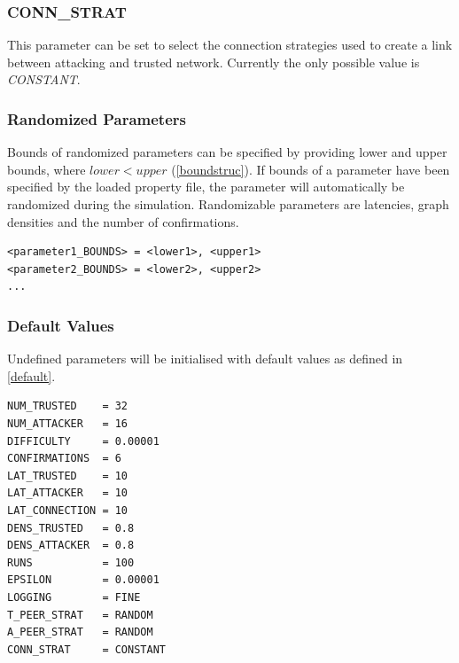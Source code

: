 \documentclass[a4paper,12pt,twoside]{report}
\begin{document}
\subsubsection{CONN\_STRAT}
This parameter can be set to select the connection strategies used to create a link between attacking and trusted network. Currently the only possible value is \textit{CONSTANT}.
\subsubsection{Randomized Parameters}
Bounds of randomized parameters can be specified by providing lower and upper bounds, where $lower < upper$ (\autoref{boundstruc}). If bounds of a parameter have been specified by the loaded property file, the parameter will automatically be randomized during the simulation. Randomizable parameters are latencies, graph densities and the number of confirmations.
\begin{lstlisting}[caption=Defining bounds of randomized parameters,label=boundstruc]
<parameter1_BOUNDS> = <lower1>, <upper1>
<parameter2_BOUNDS> = <lower2>, <upper2>
...
\end{lstlisting}
\subsubsection{Default Values}\label{defaultval}
Undefined parameters will be initialised with default values as defined in \autoref{default}. 
\begin{lstlisting}[caption=Default parameter values,label=default]
NUM_TRUSTED    = 32
NUM_ATTACKER   = 16
DIFFICULTY     = 0.00001
CONFIRMATIONS  = 6
LAT_TRUSTED    = 10
LAT_ATTACKER   = 10
LAT_CONNECTION = 10
DENS_TRUSTED   = 0.8
DENS_ATTACKER  = 0.8
RUNS           = 100
EPSILON        = 0.00001
LOGGING        = FINE
T_PEER_STRAT   = RANDOM
A_PEER_STRAT   = RANDOM
CONN_STRAT     = CONSTANT
\end{lstlisting}
\clearpage

\listoffigures
\clearpage

\listoftables
\clearpage



\end{document}

